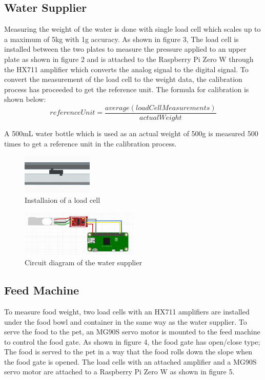 ﻿\documentclass[conference]{IEEEtran}
\begin{document}
\subsection{Water Supplier}
Measuring the weight of the water is done with single load cell which scales up to a maximum of 5kg with 1g accuracy.
As shown in figure 3, The load cell is installed between the two plates to measure the pressure applied to an upper plate as shown in figure 2 and is attached to the Raspberry Pi Zero W through the HX711 amplifier which converts the analog signal to the digital signal.
To convert the measurement of the load cell to the weight data, the calibration process has proceeded to get the reference unit.
The formula for calibration is shown below:
\[
   referenceUnit = \frac{average(loadCellMeasurements)}{actualWeight}
\]

A 500mL water bottle which is used as an actual weight of 500g is measured 500 times to get a reference unit in the calibration process.

\begin{figure}[htbp]
\centerline{\includegraphics[width=0.3\textwidth]{./images/load-cell.png}}
\caption{Installaion of a load cell}
\label{fig}
\end{figure}

\begin{figure}[htbp]
\centerline{\includegraphics[width=0.5\textwidth]{./images/water supplier circuit.jpg}}
\caption{Circuit diagram of the water supplier}
\label{fig}
\end{figure}

\subsection{Feed Machine}
To measure food weight, two load cells with an HX711 amplifiers are installed under the food bowl and container in the same way as the water supplier.
To serve the food to the pet, an MG90S servo motor is mounted to the feed machine to control the food gate.
As shown in figure 4, the food gate has open/close type; The food is served to the pet in a way that the food rolls down the slope when the food gate is opened. %
The load cells with an attached amplifier and a MG90S servo motor are attached to a Raspberry Pi Zero W as shown in figure 5.
\end{document}
